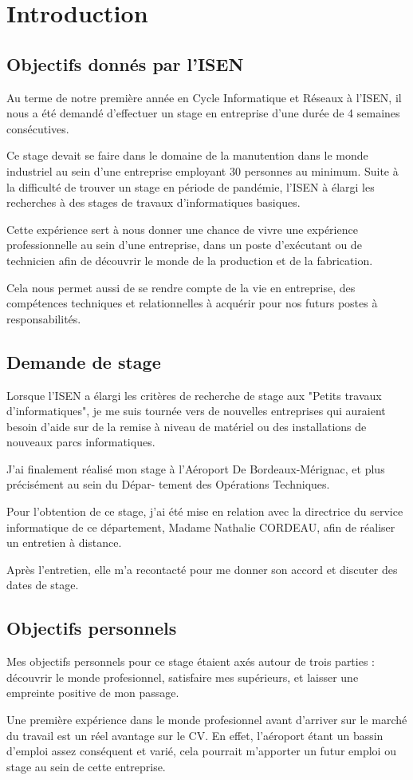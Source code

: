 \chapter{Introduction}

\section{Objectifs donnés par l'ISEN}


Au terme de notre première année en Cycle Informatique et Réseaux à l’ISEN, il nous a été demandé
d’effectuer un stage en entreprise d’une durée de 4 semaines consécutives.


Ce stage devait se faire dans le domaine de la manutention dans le monde industriel au sein d’une entreprise
employant 30 personnes au minimum. Suite à la difficulté de trouver un stage en période de pandémie, l’ISEN à élargi les recherches à
des stages de travaux d’informatiques basiques.


Cette expérience sert à nous donner une chance de vivre une expérience professionnelle au sein d’une
entreprise, dans un poste d’exécutant ou de technicien afin de découvrir le monde de la production et de la
fabrication.


Cela nous permet aussi de se rendre compte de la vie en entreprise, des compétences techniques et
relationnelles à acquérir pour nos futurs postes à responsabilités.


\section{Demande de stage}

Lorsque l’ISEN a élargi les critères de recherche de stage aux "Petits travaux d’informatiques", je me suis
tournée vers de nouvelles entreprises qui auraient besoin d’aide sur de la remise à niveau de matériel ou des
installations de nouveaux parcs informatiques.


J’ai finalement réalisé mon stage à l’Aéroport De Bordeaux-Mérignac, et plus précisément au sein du Dépar-
tement des Opérations Techniques.


Pour l’obtention de ce stage, j’ai été mise en relation avec la directrice du service informatique de ce
département, Madame Nathalie CORDEAU, afin de réaliser un entretien à distance.

Après l’entretien, elle m'a recontacté pour me donner son accord et discuter des dates de stage.


\section{Objectifs personnels}

Mes objectifs personnels pour ce stage étaient axés autour de trois parties : découvrir le monde profesionnel,
satisfaire mes supérieurs, et laisser une empreinte positive de mon passage.


Une première expérience dans le monde profesionnel avant d’arriver sur le marché du travail est un réel
avantage sur le CV. En effet, l’aéroport étant un bassin d’emploi assez conséquent et varié, cela pourrait
m’apporter un futur emploi ou stage au sein de cette entreprise.